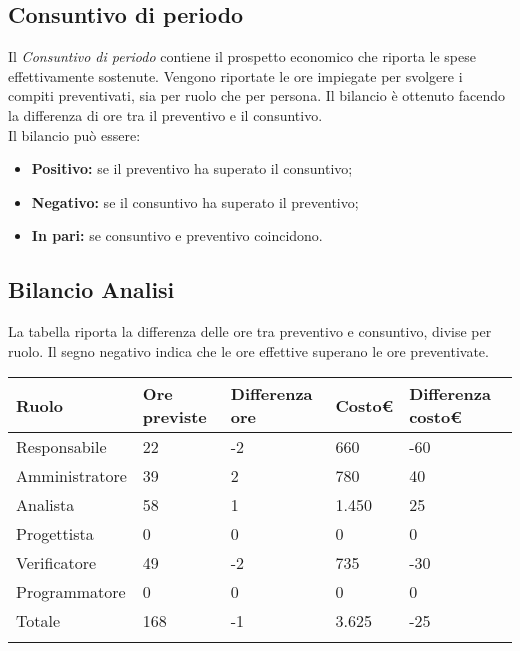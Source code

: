 \begin{flushleft}
    \chapter{Consuntivo di periodo}
    Il \textit{Consuntivo di periodo} contiene il prospetto economico che riporta le spese effettivamente sostenute. Vengono riportate le ore impiegate per svolgere i compiti preventivati, sia per
    ruolo che per persona. Il bilancio è ottenuto facendo la differenza di ore tra il preventivo e il consuntivo.\\
    Il bilancio può essere:
    \begin{itemize}
        \item \textbf{Positivo:} se il preventivo ha superato il consuntivo;
        \item \textbf{Negativo:} se il consuntivo ha superato il preventivo;
        \item \textbf{In pari:} se consuntivo e preventivo coincidono.
    \end{itemize}

   \newpage
    \section{Bilancio Analisi}
    La tabella riporta la differenza delle ore tra preventivo e consuntivo, divise per ruolo. Il segno negativo indica che le ore effettive superano le ore preventivate.  
      

        \begin{tabularx}{\textwidth}{|l|l|l|l|l|}
        \hline
        Ruolo          & Ore previste& Differenza ore & Costo\euro  &Differenza costo\euro \\ \hline
        Responsabile   &22& -2 &660 & -60   \\ \hline
        Amministratore &39& 2  &780 & 40    \\ \hline
        Analista       &58& 1 &1.450  & 25    \\ \hline
        Progettista    & 0 &0 &0 & 0     \\ \hline
        Verificatore   & 49&-2 &735 & -30   \\ \hline
        Programmatore  & 0& 0&0   & 0     \\ \hline
        Totale         &168 & -1&3.625   & -25   \\ \hline
        \caption{Differenza delle ore tra preventivo e consultivo divise per ruolo}    
    \end{tabularx}


\end{flushleft}
